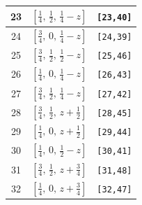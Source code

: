 \documentclass[fleqn,8pt]{jsarticle}
\begin{document}
\begin{longtable}{ccc}
23 & $\left[ \frac{1}{4},\, \frac{1}{2},\, \frac{1}{4} - z \right]$ & {\tt [23,40]} \\ \hline
24 & $\left[ \frac{3}{4},\, 0,\, \frac{1}{4} - z \right]$ & {\tt [24,39]} \\ \hline
25 & $\left[ \frac{3}{4},\, \frac{1}{2},\, \frac{1}{2} - z \right]$ & {\tt [25,46]} \\ \hline
26 & $\left[ \frac{1}{4},\, 0,\, \frac{1}{4} - z \right]$ & {\tt [26,43]} \\ \hline
27 & $\left[ \frac{3}{4},\, \frac{1}{2},\, \frac{1}{4} - z \right]$ & {\tt [27,42]} \\ \hline
28 & $\left[ \frac{3}{4},\, \frac{1}{2},\, z + \frac{1}{2} \right]$ & {\tt [28,45]} \\ \hline
29 & $\left[ \frac{1}{4},\, 0,\, z + \frac{1}{2} \right]$ & {\tt [29,44]} \\ \hline
30 & $\left[ \frac{1}{4},\, 0,\, \frac{1}{2} - z \right]$ & {\tt [30,41]} \\ \hline
31 & $\left[ \frac{3}{4},\, \frac{1}{2},\, z + \frac{3}{4} \right]$ & {\tt [31,48]} \\ \hline
32 & $\left[ \frac{1}{4},\, 0,\, z + \frac{3}{4} \right]$ & {\tt [32,47]} \\
\end{longtable}
\renewcommand{\arraystretch}{1.2}
\end{document}
